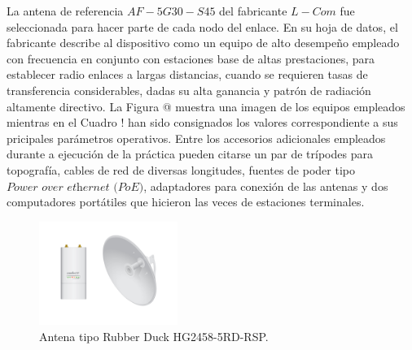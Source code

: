 \documentclass[conference]{IEEEtran}
\begin{document}
La antena de referencia $AF-5G30-S45$ del fabricante $L-Com$ fue seleccionada para hacer parte de cada nodo del enlace. En su hoja de datos, el fabricante
describe al dispositivo como un equipo de alto desempeño empleado con frecuencia en conjunto con estaciones base de altas prestaciones, para establecer 
radio enlaces a largas distancias, cuando se requieren tasas de transferencia considerables, dadas su alta ganancia y patrón de radiación altamente directivo. 
La Figura @ muestra una imagen de los equipos empleados mientras en el Cuadro ! han sido consignados los valores correspondiente a sus pricipales parámetros
operativos. Entre los accesorios adicionales empleados durante a ejecución de la práctica pueden citarse un par de trípodes para topografía, cables de red de
diversas longitudes, fuentes de poder tipo $\textit{Power over ethernet (PoE)}$, adaptadores para conexión de las antenas y dos computadores portátiles que hicieron 
las veces de estaciones terminales.  
\begin{figure}
    \centering
          \includegraphics[width=0.4\textwidth]{Equipos.png}
        \caption{Antena tipo Rubber Duck HG2458-5RD-RSP.
        }
        \label{fig:Equipos}
\end{figure}
\end{document}
